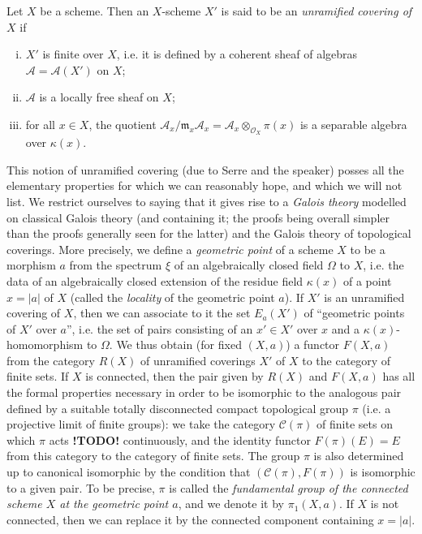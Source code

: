 \documentclass{article}
\theoremstyle{plain}
\theoremstyle{definition}
\newcommand{\sh}{\mathscr}
\newcommand{\cat}{\mathcal}
\newcommand{\fk}{\mathfrak}
\newcommand{\kres}{\kappa}
\newcommand{\todo}{\textbf{ !TODO! }}
\newcommand{\oldpage}[1]{\marginpar{\footnotesize$\Big\vert$ \textit{p.~#1}}}
\begin{document}
Let $X$ be a scheme.
Then an $X$-scheme $X'$ is said to be an \emph{unramified covering of $X$}
\oldpage{182-18}
if
\begin{enumerate}[i.]
  \item $X'$ is finite over $X$, i.e. it is defined by a coherent sheaf of algebras $\sh{A}=\sh{A}(X')$ on $X$;
  \item $\sh{A}$ is a locally free sheaf on $X$;
  \item for all $x\in X$, the quotient $\sh{A}_x/\fk{m}_x\sh{A}_x = \sh{A}_x\otimes_{\sh{O}_X}\pi(x)$ is a separable algebra over $\kres(x)$.
\end{enumerate}

This notion of unramified covering (due to Serre and the speaker) posses all the elementary properties for which we can reasonably hope, and which we will not list.
We restrict ourselves to saying that it gives rise to a \emph{Galois theory} modelled on classical Galois theory (and containing it; the proofs being overall simpler than the proofs generally seen for the latter) and the Galois theory of topological coverings.
More precisely, we define a \emph{geometric point} of a scheme $X$ to be a morphism $a$ from the spectrum $\xi$ of an algebraically closed field $\Omega$ to $X$, i.e. the data of an algebraically closed extension of the residue field $\kres(x)$ of a point $x=|a|$ of $X$ (called the \emph{locality} of the geometric point $a$).
If $X'$ is an unramified covering of $X$, then we can associate to it the set $E_a(X')$ of ``geometric points of $X'$ over $a$'', i.e. the set of pairs consisting of an $x'\in X'$ over $x$ and a $\kres(x)$-homomorphism to $\Omega$.
We thus obtain (for fixed $(X,a)$) a functor $F(X,a)$ from the category $R(X)$ of unramified coverings $X'$ of $X$ to the category of finite sets.
If $X$ is connected, then the pair given by $R(X)$ and $F(X,a)$ has all the formal properties necessary in order to be isomorphic to the analogous pair defined by a suitable totally disconnected compact topological group $\pi$ (i.e. a projective limit of finite groups): we take the category $\cat{C}(\pi)$ of finite sets on which $\pi$ acts \todo continuously, and the identity functor $F(\pi)(E)=E$ from this category to the category of finite sets.
The group $\pi$ is also determined up to canonical isomorphic by the condition that $(\cat{C}(\pi),F(\pi))$ is isomorphic to a given pair.
To be precise, $\pi$ is called the \emph{fundamental group of the connected scheme $X$ at the geometric point $a$}, and we denote it by $\pi_1(X,a)$.
If $X$ is not connected, then we can replace it by the connected component containing $x=|a|$.
\end{document}
